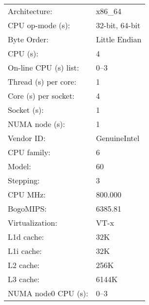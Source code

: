 %
\begin{tabular}{l l}
	Architecture:          & x86\_64 \\
	CPU op-mode  (s):      & 32-bit, 64-bit \\
	Byte Order:            & Little Endian \\
	CPU (s):               & 4 \\
	On-line CPU (s) list:  & 0--3 \\
	Thread (s) per core:   & 1 \\
	Core (s) per socket:   & 4 \\
	Socket (s):            & 1 \\
	NUMA node (s):         & 1 \\
	Vendor ID\@:           & GenuineIntel \\
	CPU family:            & 6 \\
	Model:                 & 60 \\
	Stepping:              & 3 \\
	CPU MHz:               & 800.000 \\
	BogoMIPS\@:            & 6385.81 \\
	Virtualization:        & VT-x \\
	L1d cache:             & 32K \\
	L1i cache:             & 32K \\
	L2 cache:              & 256K \\
	L3 cache:              & 6144K \\
	NUMA node0 CPU (s):    & 0--3 \\
\end{tabular}
